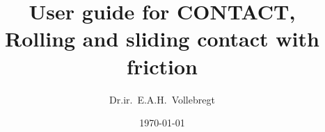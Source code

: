 \documentclass[12pt]{report}
\title{User guide for CONTACT,\\
       Rolling and sliding contact with friction}
\author{Dr.ir.\ E.A.H.\ Vollebregt}
\date{\today}
\renewcommand{\magenta}[1]{}
\begin{document}
\pagestyle{vtrep}
\maketitle


\magenta{
\begin{vtlogsheet}
\vtlogentry{1.140}{EV}{15-12-2022}{Version for release v22.2}{}
\vtlogentry{1.145}{EV}{14-04-2023}{Version for release v23.1}{}
\vtlogentry{1.146}{EV}{10-05-2023}{Added massless rail deflection ${\tt 
        F}_1=3$}{}
\vtlogentry{1.147}{EV}{19-06-2023}{Changed cntc\_getprofilevalues}{}
\vtlogentry{1.148}{EV}{31-07-2023}{Added configuration of debug outputs}{}
\vtlogentry{1.149}{EV}{11-08-2023}{Added ${\tt D}=7$ using initial contact
        position}{}
\vtlogentry{1.150}{EV}{16-08-2023}{Added comment on slice feature positions}{}
\vtlogentry{1.151}{EV}{23-08-2023}{Clear out-file upon new initialization}{}
\vtlogentry{1.152}{EV}{12-09-2023}{Delete arc-fit, add conversion formulas}{}
\vtlogentry{1.153}{EV}{04-10-2023}{Added wheel slices file}{}
\vtlogentry{1.154}{EV}{24-10-2023}{Add description of {\tt
        cntc\_getcpresults}}{}
\vtlogentry{1.155}{EV}{03-11-2023}{Version for release v23.2}{}
\vtlogentry{1.156}{EV}{10-11-2023}{Added wheel flat example}{}
\vtlogentry{1.157}{EV}{21-11-2023}{Added super grid with active window}{}
\vtlogentry{1.158}{EV}{28-11-2023}{Permit {\tt I}-digit in module 1}{}
\vtlogentry{1.159}{EV}{30-11-2023}{Extension of Cattaneo solution for
        radius $a$}{}
\vtlogentry{1.160}{EV}{01-12-2023}{Added spin center}{}
\vtlogentry{1.161}{EV}{11-12-2023}{Permit ${\tt T}=1,2$ in module 1}{}
\vtlogentry{1.162}{EV}{16-01-2024}{Changed PSFLRIN to PSFLCIN}{}
\vtlogentry{1.163}{EV}{19-03-2024}{Added force based proportional damping}{}
\vtlogentry{1.164}{EV}{03-04-2024}{Extended force based proportional damping}{}
\vtfilelocation{$<$svn-contc$>$/contact/doc}
\end{vtlogsheet}
}

\end{document}

